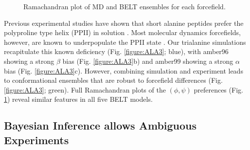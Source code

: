 \documentclass[journal=jacsat,manuscript=article]{achemso}
\begin{document}
\begin{figure}

\caption{
Ramachandran plot of MD and BELT ensembles for each forcefield.
}
\label{figure:Rama}
\end{figure}

Previous experimental studies have shown that short alanine peptides prefer the polyproline type helix (PPII) in solution \cite{Grdadolnik2011, Graf2007, Avbelj2006}.  Most molecular dynamics forcefields, however, are known to underpopulate the PPII state \cite{Graf2007,beauchamp2012protein,Nerenberg2011, Best2008}.  Our trialanine simulations recapitulate this known deficiency (Fig. \ref{figure:ALA3}; blue), with amber96 showing a strong $\beta$ bias (Fig. \ref{figure:ALA3}b) and amber99 showing a strong $\alpha$ bias (Fig. \ref{figure:ALA3}c).  However, combining simulation and experiment leads to conformational ensembles that are robust to forcefield differences (Fig. \ref{figure:ALA3}; green).  Full Ramachandran plots of the $(\phi, \psi)$ preferences (Fig. \ref{figure:Rama}) reveal similar features in all five BELT models.  

\subsection{Bayesian Inference allows Ambiguous Experiments}
\end{document}
